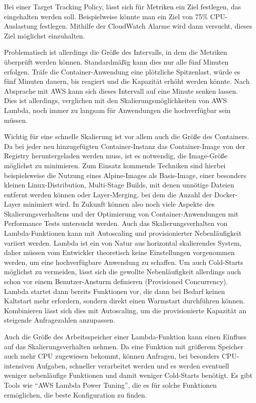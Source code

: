 Bei einer Target Tracking Policy, lässt sich für Metriken ein Ziel festlegen, das eingehalten werden soll. Beispielweise könnte man ein Ziel von 75\% CPU-Auslastung festlegen. Mithilfe der CloudWatch Alarme wird dann versucht, dieses Ziel möglichst einzuhalten. 

Problematisch ist allerdings die Größe des Intervalls, in dem die Metriken überprüft werden können. Standardmäßig kann dies nur alle fünf Minuten erfolgen. Träfe die Container-Anwendung eine plötzliche Spitzenlast, würde es fünf Minuten dauern, bis reagiert und die Kapazität erhöht werden könnte. Nach Absprache mit AWS kann sich dieses Intervall auf eine Minute senken lassen. Dies ist allerdings, verglichen mit den Skalierungsmöglichkeiten von AWS Lambda, noch immer zu langsam für Anwendungen die hochverfügbar sein müssen.

Wichtig für eine schnelle Skalierung ist vor allem auch die Größe des Containers. Da bei jeder neu hinzugefügten Container-Instanz das Container-Image von der Registry heruntergeladen werden muss, ist es notwendig, die Image-Größe möglichst zu minimieren. Zum Einsatz kommende Techniken sind hierbei beispielsweise die Nutzung eines Alpine-Images als Basis-Image, einer besonders kleinen Linux-Distribution, Multi-Stage Builds, mit denen unnötige Dateien entfernt werden können oder Layer-Merging, bei dem die Anzahl der Docker-Layer minimiert wird.
In Zukunft können also noch viele Aspekte des Skalierungsverhaltens und der Optimierung von Container-Anwendungen mit Performance Tests untersucht werden. 
Auch das Skalierungsverhalten von Lambda-Funktionen kann mit Autoscaling und provisionierter Nebenläufigkeit variiert werden. Lambda ist ein von Natur aus horizontal skalierendes System, daher müssen vom Entwickler theoretisch keine Einstellungen vorgenommen werden, um eine hochverfügbare Anwendung zu schaffen. Um auch Cold-Starts möglichst zu vermeiden, lässt sich die gewollte Nebenläufigkeit allerdings auch schon vor einem Benutzer-Ansturm definieren (Provisioned Concurrency). Lambda startet dann bereits Funktionen vor, die dann bei Bedarf keinen Kaltstart mehr erfordern, sondern direkt einen Warmstart durchführen können. Kombinieren lässt sich dies mit Autoscaling, um die provisionierte Kapazität an steigende Anfragezahlen anzupassen. 

Auch die Größe des Arbeitsspeicher einer Lambda-Funktion kann einen Einfluss auf das Skalierungsverhalten nehmen. Da eine Funktion mit größerem Speicher auch mehr CPU zugewiesen bekommt, können Anfragen, bei besonders CPU-intensiven Aufgaben, schneller verarbeitet werden und es werden eventuell weniger nebenläufige Funktionen und damit weniger Cold-Starts benötigt. Es gibt Tools wie "`AWS Lambda Power Tuning"'\cite{casalboni_alexcasalboniaws-lambda-power-tuning_2021}, die es für solche Funktionen ermöglichen, die beste Konfiguration zu finden.

